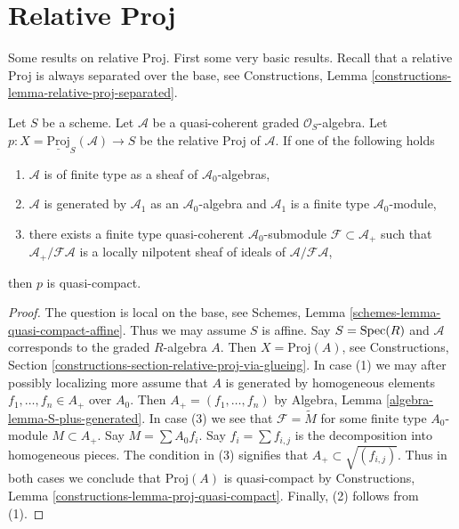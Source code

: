 \section{Relative Proj}
\label{section-relative-proj}

\noindent
Some results on relative Proj.
First some very basic results. Recall that a relative Proj is always
separated over the base, see
Constructions, Lemma \ref{constructions-lemma-relative-proj-separated}.

\begin{lemma}
\label{lemma-relative-proj-quasi-compact}
Let $S$ be a scheme. Let $\mathcal{A}$ be a quasi-coherent graded
$\mathcal{O}_S$-algebra. Let
$p : X = \underline{\text{Proj}}_S(\mathcal{A}) \to S$ be the relative
Proj of $\mathcal{A}$. If one of the following holds
\begin{enumerate}
\item $\mathcal{A}$ is of finite type as a sheaf of
$\mathcal{A}_0$-algebras,
\item $\mathcal{A}$ is generated by $\mathcal{A}_1$ as an
$\mathcal{A}_0$-algebra and $\mathcal{A}_1$ is a finite type
$\mathcal{A}_0$-module,
\item there exists a finite type quasi-coherent $\mathcal{A}_0$-submodule
$\mathcal{F} \subset \mathcal{A}_{+}$ such that
$\mathcal{A}_{+}/\mathcal{F}\mathcal{A}$ is a locally nilpotent
sheaf of ideals of $\mathcal{A}/\mathcal{F}\mathcal{A}$,
\end{enumerate}
then $p$ is quasi-compact.
\end{lemma}

\begin{proof}
The question is local on the base, see
Schemes, Lemma \ref{schemes-lemma-quasi-compact-affine}.
Thus we may assume $S$ is affine.
Say $S = \mathop{\mathrm{Spec}}(R)$ and $\mathcal{A}$ corresponds to the
graded $R$-algebra $A$. Then $X = \text{Proj}(A)$, see
Constructions, Section \ref{constructions-section-relative-proj-via-glueing}.
In case (1) we may after possibly localizing more
assume that $A$ is generated by homogeneous elements
$f_1, \ldots, f_n \in A_{+}$ over $A_0$. Then
$A_{+} = (f_1, \ldots, f_n)$ by
Algebra, Lemma \ref{algebra-lemma-S-plus-generated}.
In case (3) we see that $\mathcal{F} = \widetilde{M}$
for some finite type $A_0$-module $M \subset A_{+}$. Say
$M = \sum A_0f_i$. Say $f_i = \sum f_{i, j}$ is the decomposition
into homogeneous pieces. The condition in (3) signifies that
$A_{+} \subset \sqrt{(f_{i, j})}$. Thus in both cases we conclude that
$\text{Proj}(A)$ is quasi-compact by
Constructions, Lemma \ref{constructions-lemma-proj-quasi-compact}.
Finally, (2) follows from (1).
\end{proof}

